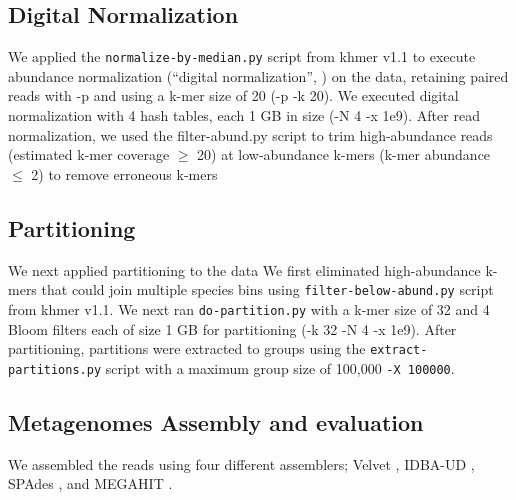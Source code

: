 \subsection*{Digital Normalization} 

We applied the {\tt normalize-by-median.py} script from khmer v1.1 to
execute abundance normalization (``digital normalization'', \cite{brown2012})  on the data, retaining paired reads with -p and using a
k-mer size of 20 (-p -k 20).  We executed digital normalization with 4
hash tables, each 1 GB in size (-N 4 -x 1e9).  After read
normalization, we used the filter-abund.py script to trim
high-abundance reads (estimated k-mer coverage $\geq$ 20) at low-abundance
k-mers (k-mer abundance $\leq$ 2)   %
to remove erroneous k-mers  \cite{qingpeng2014} \cite{streaming} 


\subsection*{Partitioning} 

We next applied partitioning to the data \cite{jpell2012, ahowe2014}  %
We first eliminated high-abundance k-mers that could join multiple
species bins using {\tt filter-below-abund.py} script from khmer v1.1.
We next ran {\tt do-partition.py} with a k-mer size of 32 and 4 Bloom
filters each of size 1 GB for partitioning (-k 32 -N 4 -x 1e9).  After
partitioning, partitions were extracted to groups using the {\tt extract-partitions.py} script with a maximum group size of 100,000 {\tt -X 100000}.

\subsection*{Metagenomes Assembly and evaluation}

We assembled the reads using four different assemblers; Velvet \cite{velvet}, IDBA-UD \cite{idba}, SPAdes \cite{spades}, and MEGAHIT \cite{megahit}.

